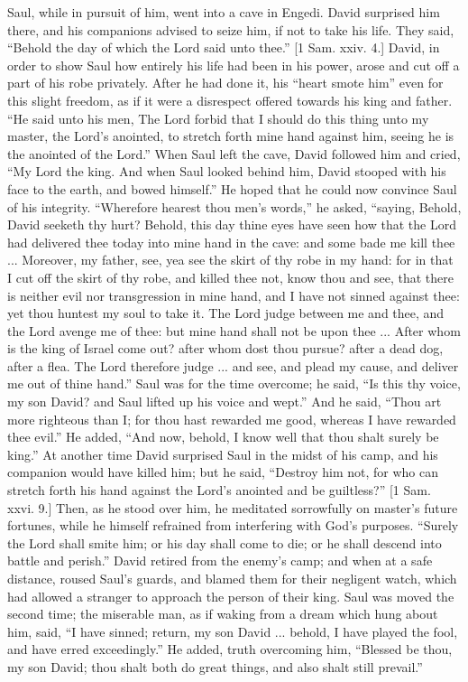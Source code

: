 Saul, while in pursuit of him, went into a cave in Engedi. David
surprised him there, and his companions advised to seize him, if not
to take his life. They said, ``Behold the day of which the Lord
said unto thee.'' [1 Sam. xxiv. 4.] David, in order to show Saul
how entirely his life had been in his power, arose and cut off a part
of his robe privately. After he had done it, his ``heart smote
him'' even for this slight freedom, as if it were a disrespect
offered towards his king and father. ``He said unto his men, The
Lord forbid that I should do this thing unto my master, the Lord's
anointed, to stretch forth mine hand against him, seeing he is the
anointed of the Lord.'' When Saul left the cave, David followed
him and cried, ``My Lord the king. And when Saul looked behind
him, David stooped with his face to the earth, and bowed
himself.'' He hoped that he could now convince Saul of his
integrity. ``Wherefore hearest thou men's words,'' he asked,
``saying, Behold, David seeketh thy hurt? Behold, this day thine
eyes have seen how that the Lord had delivered thee today into mine
hand in the cave: and some bade me kill thee ... Moreover, my father,
see, yea see the skirt of thy robe in my hand: for in that I cut off
the skirt of thy robe, and killed thee not, know thou and see, that
there is neither evil nor transgression in mine hand, and I have not
sinned against thee: yet thou huntest my soul to take it. The Lord
judge between me and thee, and the Lord avenge me of thee: but mine
hand shall not be upon thee ... After whom is the king of Israel come
out? after whom dost thou pursue? after a dead dog, after a flea. The
Lord therefore judge ... and see, and plead my cause, and deliver me
out of thine hand.'' Saul was for the time overcome; he said,
``Is this thy voice, my son David? and Saul lifted up his voice
and wept.'' And he said, ``Thou art more righteous than I; for
thou hast rewarded me good, whereas I have rewarded thee evil.''
He added, ``And now, behold, I know well that thou shalt surely be
king.'' At another time David surprised Saul in the midst of his
camp, and his companion would have killed him; but he said,
``Destroy him not, for who can stretch forth his hand against the
Lord's anointed and be guiltless?'' [1 Sam. xxvi. 9.] Then, as he
stood over him, he meditated sorrowfully on master's future fortunes,
while he himself refrained from interfering with God's purposes.
``Surely the Lord shall smite him; or his day shall come to die;
or he shall descend into battle and perish.'' David retired from
the enemy's camp; and when at a safe distance, roused Saul's guards,
and blamed them for their negligent watch, which had allowed a
stranger to approach the person of their king. Saul was moved the
second time; the miserable man, as if waking from a dream which hung
about him, said, ``I have sinned; return, my son David ... behold,
I have played the fool, and have erred exceedingly.'' He added,
truth overcoming him, ``Blessed be thou, my son David; thou shalt
both do great things, and also shalt still prevail.''

